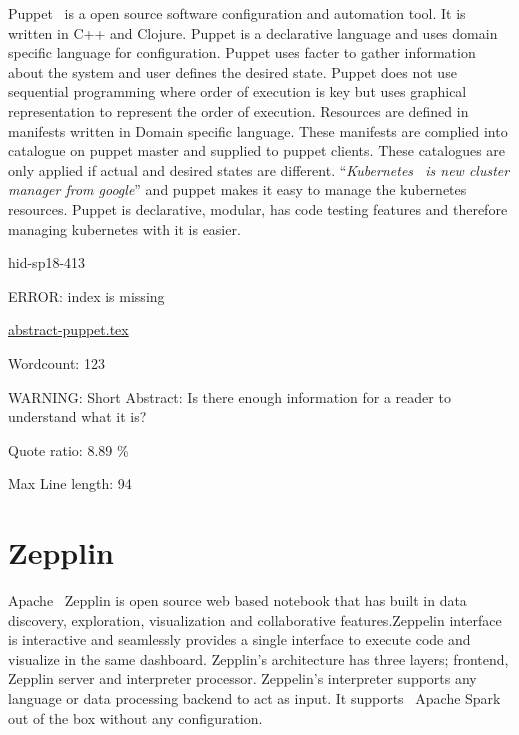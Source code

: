 Puppet~\cite{hid-sp18-413-puppet} is a open source software configuration and
automation tool. It is written in C++ and Clojure. Puppet is a declarative
language and uses domain specific language for configuration. Puppet uses facter
to gather information about the system and user defines the desired
state. Puppet does not use sequential programming where order of execution is
key but uses graphical representation to represent the order of
execution. Resources are defined in manifests written in Domain specific
language. These manifests are complied into catalogue on puppet master and
supplied to puppet clients. These catalogues are only applied if actual and
desired states are different. \color{blue}``\emph{Kubernetes~\cite{hid-sp18-413-Kubernetes} is
new cluster manager from google}''\color{black} and puppet makes it easy to manage the
kubernetes resources. Puppet is declarative, modular, has code testing features
and therefore managing kubernetes with it is easier.


\begin{IU}

hid-sp18-413

ERROR: index is missing

\href{https://github.com/cloudmesh-community/hid-sp18-413/blob/master//technology/abstract-puppet.tex}{abstract-puppet.tex}

 

Wordcount: 123

WARNING: Short Abstract: Is there enough information for a reader to understand what it is?


Quote ratio: 8.89 \%
 
Max Line length: 94
\end{IU}

\section{Zepplin}

Apache~\cite{hid-sp18-413-Zeppelin} Zepplin is open source web based notebook
that has built in data discovery, exploration, visualization and collaborative
features.Zeppelin interface is interactive and seamlessly provides a single
interface to execute code and visualize in the same dashboard. Zepplin’s
architecture has three layers; frontend, Zepplin server and interpreter
processor. Zeppelin’s interpreter supports any language or data processing
backend to act as input. It supports~\cite{hid-sp18-413-ApacheSpark} Apache
Spark out of the box without any configuration.


